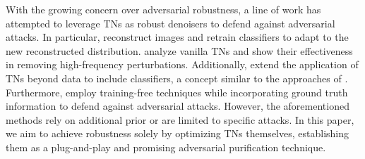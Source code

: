 With the growing concern over adversarial robustness, a line of work has attempted to leverage TNs as robust denoisers to defend against adversarial attacks. In particular, \citet{yang2019me} reconstruct images and retrain classifiers to adapt to the new reconstructed distribution. \citet{entezari2022tensorshield} analyze vanilla TNs and show their effectiveness in removing high-frequency perturbations.
Additionally, \citep{bhattarai2023robust} extend the application of TNs beyond data to include classifiers, a concept similar to the approaches of \citep{rudkiewicz2024robustness,phan2023cstar}. Furthermore, \citep{song2024training} employ training-free techniques while incorporating ground truth information to defend against adversarial attacks. However, the aforementioned methods rely on additional prior or are limited to specific attacks.
In this paper, we aim to achieve robustness solely by optimizing TNs themselves, establishing them as a plug-and-play and promising adversarial purification technique.